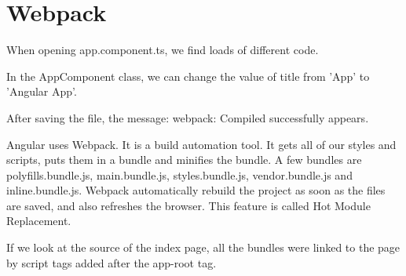 \chapter{Webpack}
When opening app.component.ts, we find loads of different code.

In the AppComponent class, we can change the value of title from 'App' to 'Angular App'.

After saving the file, the message: webpack: Compiled successfully appears.

Angular uses Webpack. It is a build automation tool. It gets all of our styles and scripts, puts them in a bundle and minifies the bundle. A few bundles are polyfills.bundle.js, main.bundle.js, styles.bundle.js, vendor.bundle.js and inline.bundle.js. Webpack automatically rebuild the project as soon as the files are saved, and also refreshes the browser. This feature is called Hot Module Replacement.

If we look at the source of the index page, all the bundles were linked to the page by script tags added after the app-root tag.